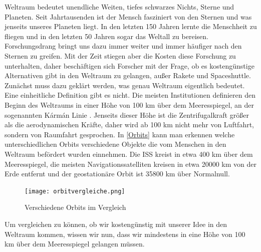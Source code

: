 \documentclass[a4paper, 10pt]{report}
\begin{document}
Weltraum bedeutet unendliche Weiten, tiefes schwarzes Nichts, Sterne und Planeten. Seit Jahrtausenden ist der Mensch fasziniert von den Sternen und was jenseits unseres Planeten liegt. In den letzten 150 Jahren lernte die Menschheit zu fliegen und in den letzten 50 Jahren sogar das Weltall zu bereisen. Forschungsdrang bringt uns dazu immer weiter und immer häufiger nach den Sternen zu greifen.
Mit der Zeit stiegen aber die Kosten diese Forschung zu unterhalten, daher beschäftigen sich Forscher mit der Frage, ob es kostengünstige Alternativen gibt in den Weltraum zu gelangen, außer Rakete und Spaceshuttle.\\
Zunächst muss dazu geklärt werden, was genau Weltraum eigentlich bedeutet. Eine einheitliche Definition gibt es nicht. Die meisten Institutionen definieren den Beginn des Weltraums in einer Höhe von 100 km über dem Meeresspiegel, an der sogenannten Kármán Linie \cite[vgl. 2.b)]{fai_weltraum}. Jenseits dieser Höhe ist die Zentrifugalkraft größer als die aerodynamischen Kräfte, daher wird ab 100 km nicht mehr von Luftfahrt, sondern von Raumfahrt gesprochen. 
In \autoref{Orbits} kann man erkennen welche unterschiedlichen Orbits verschiedene Objekte die vom Menschen in den Weltraum befördert wurden einnehmen. Die ISS kreist in etwa 400 km über dem Meeresspiegel, die meisten Navigationssatelliten kreisen in etwa 20000 km von der Erde entfernt und der geostationäre Orbit ist 35800 km über Normalnull.

\begin{figure}[!hbt]
\centering
\texttt{[image: orbitvergleiche.png]} 
\cite{wiki:orbitals}

\caption{Verschiedene Orbits im Vergleich} 
	\label{Orbits}
	
	
\end{figure}

Um vergleichen zu können, ob wir kostengünstig mit unserer Idee in den Weltraum kommen, wissen wir nun, dass wir mindestens in eine Höhe von 100 km über dem Meeresspiegel gelangen müssen. 
\end{document}
